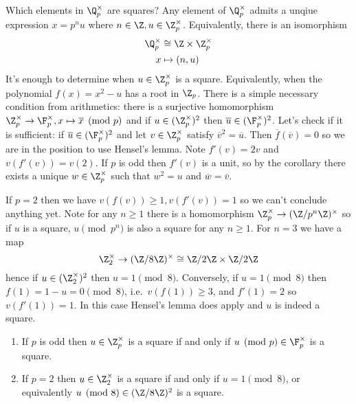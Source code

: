 \documentclass[a4paper]{article}
\begin{document}
\begin{eg}
  Which elements in \(\Q_p^\times\) are squares? Any element of \(\Q_p^\times\) admits a unqiue expression \(x = p^n u\) where \(n \in \Z, u \in \Z_p^\times\). Equivalently, there is an isomorphism
  \begin{align*}
    \Q_p^\times &\cong \Z \times \Z_p^\times \\
    x &\mapsto (n, u)
  \end{align*}
  It's enough to determine when \(u \in \Z_p^\times\) is a square. Equivalently, when the polynomial \(f(x) = x^2 - u\) has a root in \(\Z_p\). There is a simple necessary condition from arithmetics: there is a surjective homomorphism \(\Z_p^\times \to \F_p^\times, x \mapsto \overline x \pmod p\) and if \(u \in (\Z_p^\times)^2\) then \(\overline u \in (\F_p^\times)^2\). Let's check if it is sufficient: if \(\overline u \in (\F_p^\times)^2\) and let \(v \in \Z_p^\times\) satisfy \(\overline v^2 = \overline u\). Then \(\overline f(\overline v) = 0\) so we are in the position to use Hensel's lemma. Note \(f'(v) = 2v\) and \(v(f'(v)) = v(2)\). If \(p\) is odd then \(f'(v)\) is a unit, so by the corollary there exists a unique \(w \in \Z_p^\times\) such that \(w^2 = u\) and \(\overline w = \overline v\).

  If \(p = 2\) then we have \(v(f(v)) \geq 1, v(f'(v)) = 1\) so we can't conclude anything yet. Note for any \(n \geq 1\) there is a homomorphism \(\Z_p^\times \to (\Z/p^n\Z)^\times\) so if \(u\) is a square, \(u \pmod{p^n}\) is also a square for any \(n \geq 1\). For \(n = 3\) we have a map
  \[
    \Z_2^\times \to (\Z/8\Z)^\times \cong \Z/2\Z \times \Z/2\Z
  \]
  hence if \(u \in (\Z_2^\times)^2\) then \(u = 1 \pmod 8\). Conversely, if \(u = 1 \pmod 8\) then \(f(1) = 1 - u = 0 \pmod 8\), i.e.\ \(v(f(1)) \geq 3\), and \(f'(1) = 2\) so \(v(f'(1)) = 1\). In this case Hensel's lemma does apply and \(u\) is indeed a square.
\end{eg}

\begin{proposition}\leavevmode
  \begin{enumerate}
  \item If \(p\) is odd then \(u \in \Z_p^\times\) is a square if and only if \(u \pmod p \in \F_p^\times\) is a square.
  \item If \(p = 2\) then \(u \in \Z_2^\times\) is a square if and only if \(u = 1 \pmod 8\), or equivalently \(u \pmod 8 \in (\Z/8\Z)^2\) is a square.
  \end{enumerate}
\end{proposition}
\end{document}
